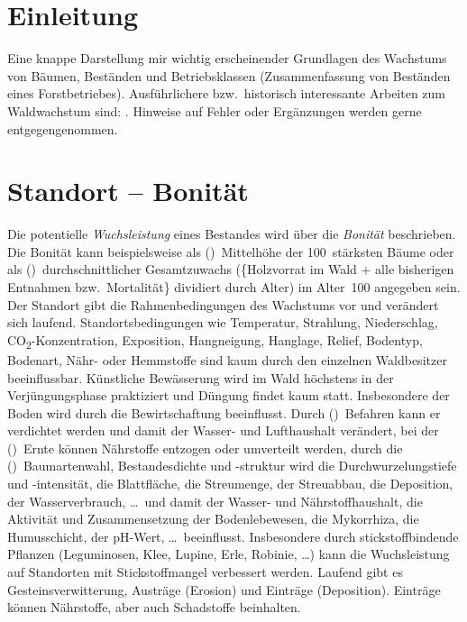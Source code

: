\documentclass[twocolumn, paper=a4, fontsize=10pt]{scrartcl}
\begin{document}

\tableofcontents

\section{Einleitung}

Eine knappe Darstellung mir wichtig erscheinender Grundlagen des Wachstums von
Bäumen, Beständen und Betriebsklassen (Zusammenfassung von Beständen eines
Forstbetriebes). Ausführlichere bzw.\ historisch interessante Arbeiten zum
Waldwachstum sind:
\cite{guttenberg1885Wachstumsgesetze,guttenberg1912ZuwachslehreInHandbuchDerForstwissenschaft,vanselow1941Zuwachslehre,weck1948,wiedemann1951Ertragskunde,assmann1961Waldertraskunde,erteld1966Waldertragslehre,mitscherlich1975WaldWachstumUmwelt,kramer1988Waldwachstumslehre,wenk1990Waldertragslehre,Gadow1999Modelling,Gadov2003Waldstruktur,pretzsch2002Grundlagen,Pretzsch2003Modellierung,Vanclay2006,Weiskittel2011,Pretzsch2019}.
Hinweise auf Fehler oder Ergänzungen werden gerne entgegengenommen.

\section{Standort -- Bonität}

Die potentielle \emph{Wuchsleistung} eines Bestandes wird über die \emph{Bonität} beschrieben. Die Bonität kann beispielsweise als (\textbullet)~Mittelhöhe der 100~stärksten Bäume oder als (\textbullet)~durchschnittlicher Gesamtzuwachs (\{Holzvorrat im Wald + alle bisherigen Entnahmen bzw.\ Mortalität\} dividiert durch Alter) im Alter~100 angegeben sein. Der Standort gibt die Rahmenbedingungen des Wachstums vor und verändert sich laufend. Standortsbedingungen wie Temperatur, Strahlung, Niederschlag, \texorpdfstring{CO\textsubscript{2}-Konzen\-tra\-ti\-on}{CO2-Konzentration}, Exposition, Hangneigung, Hanglage, Relief, Bodentyp, Bodenart, Nähr- oder Hemmstoffe sind kaum durch den einzelnen Waldbesitzer beeinflussbar. Künstliche Bewässerung wird im Wald höchstens in der Verjüngungsphase praktiziert und Düngung findet kaum statt. Insbesondere der Boden wird durch die Bewirtschaftung beeinflusst. Durch (\textbullet)~Befahren kann er verdichtet werden und damit der Wasser- und Lufthaushalt verändert, bei der (\textbullet)~Ernte können Nährstoffe entzogen oder umverteilt werden, durch die (\textbullet)~Baumartenwahl, Bestandesdichte und -struktur wird die Durchwurzelungstiefe und -intensität, die Blattfläche, die Streumenge, der Streuabbau, die Deposition, der Wasserverbrauch, \dots\ und damit der Wasser- und Nährstoffhaushalt, die Aktivität und Zusammensetzung der Bodenlebewesen, die Mykorrhiza, die Humusschicht, der pH-Wert, \dots\ beeinflusst. Insbesondere durch stickstoffbindende Pflanzen (Leguminosen, Klee, Lupine, Erle, Robinie, \dots) kann die Wuchsleistung auf Standorten mit Stickstoffmangel verbessert werden. Laufend gibt es Gesteinsverwitterung, Austräge (Erosion) und Einträge (Deposition). Einträge können Nährstoffe, aber auch Schadstoffe beinhalten.
\end{document}
